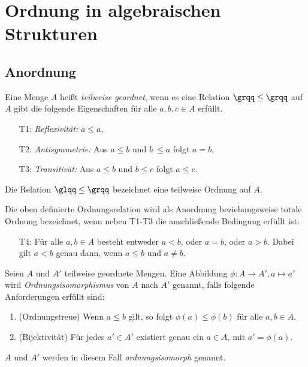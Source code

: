 \section{Ordnung in algebraischen Strukturen}
\subsection{Anordnung}
\begin{defn}\label{defgs} 
Eine Menge $A$ heißt \textit{teilweise geordnet}, wenn es eine Relation $ \grqq\leq\grqq $ auf $A$ gibt die folgende Eigenschaften für alle $ a,b,c \in A$  erfüllt.
%
\begin{enumerate}
\item[T1:] \textit{Reflexivität: } $a \leq  a$,
\item[T2:] \textit{Antisymmetrie: } Aus $a \leq  b$ und $b~ \leq a$ folgt $a = b$,
\item[T3:] \textit{Transitivät: } Aus $a \leq b$ und $b \leq c$ folgt $a \leq c$.
\end{enumerate}
%
Die Relation $\glqq \leq\grqq$ bezeichnet eine teilweise Ordnung auf $A$.
\end{defn}
Die oben definierte Ordnungsrelation wird als Anordnung beziehungsweise totale Ordnung bezeichnet, wenn neben T1-T3 die anschließende Bedingung erfüllt ist:
%
\begin{enumerate}
\item[T4:] Für alle $a, b \in A$ besteht entweder $a < b$, oder $a = b$, oder $a > b$. Dabei gilt $a < b$ genau dann, wenn $a \leq b$ und $a\neq b$. 
\end{enumerate}
%
%
%
%
%
%
%
\begin{defn}\label{ordnungsisomorph}
Seien $A$ und $A'$ teilweise geordnete Mengen. Eine Abbildung $\phi \colon A \rightarrow A', a \mapsto a'$ wird \textit{Ordnungsisomorphismus} von $A$ nach $A'$ genannt, falls folgende Anforderungen erfüllt sind:
\begin{enumerate}
\item (Ordnungstreue) Wenn $a \leq b$ gilt, so folgt $\phi(a) \leq \phi(b)$ für alle $a, b  \in A$.
\item (Bijektivität) Für jedes $a' \in A'$ existiert genau ein $a \in A$, mit $a' = \phi(a)$.
\end{enumerate}
$A$ und $A'$ werden in diesem Fall \textit{ordnungsisomorph} genannt.
\end{defn}
